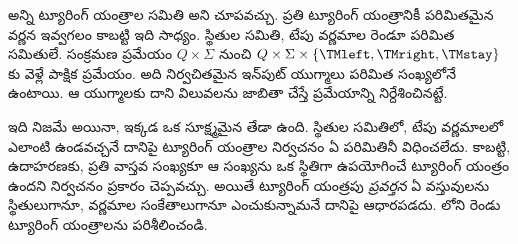 \documentclass[../../../include/open-logic-section]{subfiles}
\begin{document}

\begin{explain}
అన్ని ట్యూరింగ్ యంత్రాల సమితి  అని చూపవచ్చు. ప్రతి
ట్యూరింగ్ యంత్రానికీ పరిమితమైన వర్ణన ఇవ్వగలం కాబట్టి ఇది సాధ్యం. స్థితుల
సమితి, టేపు వర్ణమాల రెండూ పరిమిత సమితులే. సంక్రమణ ప్రమేయం $Q \times \Sigma$
నుంచి $Q \times \Sigma \times \{\TMleft, \TMright, \TMstay\}$కు వెళ్లే పాక్షిక
ప్రమేయం. అది నిర్వచితమైన ఇన్‌పుట్ యుగ్మాలు పరిమిత సంఖ్యలోనే ఉంటాయి. ఆ
యుగ్మాలకు దాని విలువలను జాబితా చేస్తే ప్రమేయాన్ని నిర్దేశించినట్టే.

ఇది నిజమే అయినా, ఇక్కడ ఒక సూక్ష్మమైన తేడా ఉంది. స్థితుల సమితిలో, టేపు
వర్ణమాలలో ఎలాంటి  ఉండవచ్చనే దానిపై ట్యూరింగ్ యంత్రాల నిర్వచనం
ఏ పరిమితినీ విధించలేదు. కాబట్టి, ఉదాహరణకు, ప్రతి వాస్తవ సంఖ్యకూ ఆ సంఖ్యను
ఒక స్థితిగా ఉపయోగించే ట్యూరింగ్ యంత్రం ఉందని నిర్వచనం ప్రకారం చెప్పవచ్చు. అయితే ట్యూరింగ్
యంత్రపు \emph{ప్రవర్తన} ఏ వస్తువులను స్థితులుగానూ, వర్ణమాల సంకేతాలుగానూ ఎంచుకున్నామనే
దానిపై ఆధారపడదు.
లోని రెండు ట్యూరింగ్ యంత్రాలను పరిశీలించండి.
\begin{figure}
\begin{center}
\\
\end{center}
\end{figure}
\end{explain}
\end{document}
